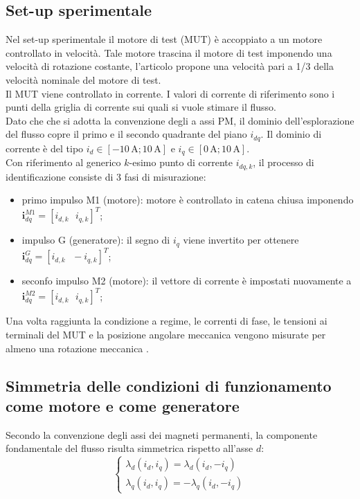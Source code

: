 \subsection{Set-up sperimentale}
Nel set-up sperimentale il motore di test (MUT) è accoppiato a un motore controllato in velocità. Tale motore trascina il motore di test imponendo una velocità di rotazione costante, l'articolo \cite{bojoi2024} propone una velocità pari a 1/3 della velocità nominale del motore di test.\\
Il MUT viene controllato in corrente. I valori di corrente di riferimento sono i punti della griglia di corrente sui quali si vuole stimare il flusso.\\
Dato che che si adotta la convenzione degli a assi PM, il dominio dell'esplorazione del flusso copre il primo e il secondo quadrante del piano $i_{dq}$. Il dominio di corrente è del tipo $i_d \in [-10\,\text{A}; 10\,\text{A}]$ e $i_q \in [0\,\text{A}; 10\,\text{A}]$.\\
Con riferimento al generico $k$-esimo punto di corrente $i_{dq,k}$, il processo di identificazione consiste di 3 fasi di misurazione:
\begin{itemize}
    \item primo impulso M1 (motore): motore è controllato in catena chiusa imponendo $\bm{i}_{dq}^{M1}=[i_{d,k}\ \ \ i_{q,k}]^T$;
    \item  impulso G (generatore): il segno di $i_q$ viene invertito per ottenere  $\bm{i}_{dq}^{G}=[i_{d,k}\ \ \ -i_{q,k}]^T$;
    \item seconfo impulso M2 (motore): il vettore di corrente è impostati nuovamente a
    $\bm{i}_{dq}^{M2}=[i_{d,k}\ \ \ i_{q,k}]^T$;
\end{itemize}
Una volta raggiunta la condizione a regime, le correnti di fase, le tensioni ai terminali del MUT e la posizione angolare meccanica vengono misurate per almeno una rotazione meccanica \cite{bojoi2024}.
\subsection{Simmetria delle condizioni di funzionamento come motore e come generatore}
Secondo la convenzione degli assi dei magneti permanenti, la componente fondamentale del flusso risulta simmetrica rispetto all'asse $d$:
\begin{equation}
\begin{cases}
    \lambda_d(i_d, i_q) = \lambda_d(i_d, -i_q) \\
    \lambda_q(i_d, i_q) = -\lambda_q(i_d, -i_q)
\end{cases}
\end{equation}

